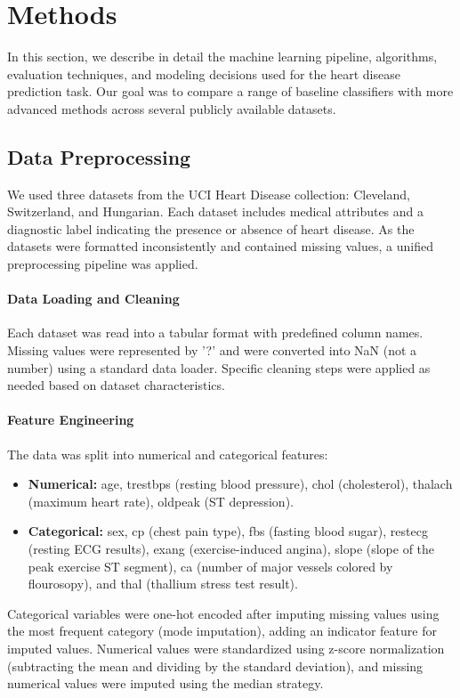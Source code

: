 \documentclass{article}
\begin{document}
\section{Methods} %
\label{sec:methods} %

In this section, we describe in detail the machine learning pipeline, algorithms, evaluation techniques, and modeling decisions used for the heart disease prediction task. Our goal was to compare a range of baseline classifiers with more advanced methods across several publicly available datasets.

\subsection{Data Preprocessing}
\label{sec:data_preprocessing} %

We used three datasets from the UCI Heart Disease collection: Cleveland, Switzerland, and Hungarian. Each dataset includes medical attributes and a diagnostic label indicating the presence or absence of heart disease. As the datasets were formatted inconsistently and contained missing values, a unified preprocessing pipeline was applied.

\paragraph{Data Loading and Cleaning}
Each dataset was read into a tabular format with predefined column names. Missing values were represented by '?' and were converted into NaN (not a number) using a standard data loader. Specific cleaning steps were applied as needed based on dataset characteristics.

\paragraph{Feature Engineering}
The data was split into numerical and categorical features:
\begin{itemize}
\item \textbf{Numerical:} age, trestbps (resting blood pressure), chol (cholesterol), thalach (maximum heart rate), oldpeak (ST depression).
\item \textbf{Categorical:} sex, cp (chest pain type), fbs (fasting blood sugar), restecg (resting ECG results), exang (exercise-induced angina), slope (slope of the peak exercise ST segment), ca (number of major vessels colored by flourosopy), and thal (thallium stress test result).
\end{itemize}
Categorical variables were one-hot encoded after imputing missing values using the most frequent category (mode imputation), adding an indicator feature for imputed values. Numerical values were standardized using z-score normalization (subtracting the mean and dividing by the standard deviation), and missing numerical values were imputed using the median strategy.
\end{document}
